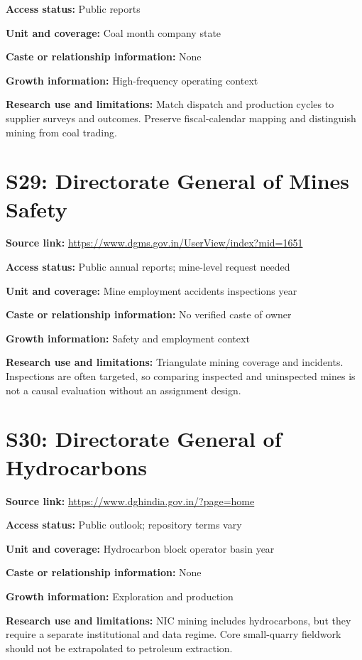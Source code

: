 \documentclass[11pt,a4paper]{report}
\begin{document}
\textbf{Access status:} Public reports

\textbf{Unit and coverage:} Coal month company state

\textbf{Caste or relationship information:} None

\textbf{Growth information:} High-frequency operating context

\textbf{Research use and limitations:} Match dispatch and production cycles to supplier surveys and outcomes. Preserve fiscal-calendar mapping and distinguish mining from coal trading.

\section{S29: Directorate General of Mines Safety}\hypertarget{S29}{}
\textbf{Source link:} \url{https://www.dgms.gov.in/UserView/index?mid=1651}

\textbf{Access status:} Public annual reports; mine-level request needed

\textbf{Unit and coverage:} Mine employment accidents inspections year

\textbf{Caste or relationship information:} No verified caste of owner

\textbf{Growth information:} Safety and employment context

\textbf{Research use and limitations:} Triangulate mining coverage and incidents. Inspections are often targeted, so comparing inspected and uninspected mines is not a causal evaluation without an assignment design.

\section{S30: Directorate General of Hydrocarbons}\hypertarget{S30}{}
\textbf{Source link:} \url{https://www.dghindia.gov.in/?page=home}

\textbf{Access status:} Public outlook; repository terms vary

\textbf{Unit and coverage:} Hydrocarbon block operator basin year

\textbf{Caste or relationship information:} None

\textbf{Growth information:} Exploration and production

\textbf{Research use and limitations:} NIC mining includes hydrocarbons, but they require a separate institutional and data regime. Core small-quarry fieldwork should not be extrapolated to petroleum extraction.
\end{document}
